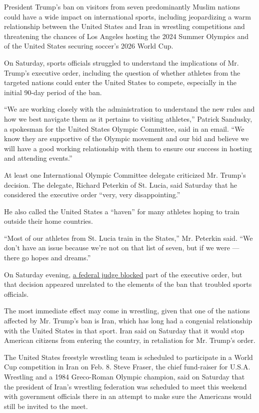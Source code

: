 President Trump's ban on visitors from seven predominantly Muslim
nations could have a wide impact on international sports, including
jeopardizing a warm relationship between the United States and Iran in
wrestling competitions and threatening the chances of Los Angeles
hosting the 2024 Summer Olympics and of the United States securing
soccer's 2026 World Cup.

On Saturday, sports officials struggled to understand the implications
of Mr. Trump's executive order, including the question of whether
athletes from the targeted nations could enter the United States to
compete, especially in the initial 90-day period of the ban.

``We are working closely with the administration to understand the new
rules and how we best navigate them as it pertains to visiting
athletes,'' Patrick Sandusky, a spokesman for the United States Olympic
Committee, said in an email. ``We know they are supportive of the
Olympic movement and our bid and believe we will have a good working
relationship with them to ensure our success in hosting and attending
events.''

At least one International Olympic Committee delegate criticized Mr.
Trump's decision. The delegate, Richard Peterkin of St. Lucia, said
Saturday that he considered the executive order ``very, very
disappointing.''

He also called the United States a ``haven'' for many athletes hoping to
train outside their home countries.

``Most of our athletes from St. Lucia train in the States,'' Mr.
Peterkin said. ``We don't have an issue because we're not on that list
of seven, but if we were --- there go hopes and dreams.''

On Saturday evening,
\href{https://www.nytimes3xbfgragh.onion/2017/01/28/us/refugees-detained-at-us-airports-prompting-legal-challenges-to-trumps-immigration-order.html}{a
federal judge blocked} part of the executive order, but that decision
appeared unrelated to the elements of the ban that troubled sports
officials.

The most immediate effect may come in wrestling, given that one of the
nations affected by Mr. Trump's ban is Iran, which has long had a
congenial relationship with the United States in that sport. Iran said
on Saturday that it would stop American citizens from entering the
country, in retaliation for Mr. Trump's order.

The United States freestyle wrestling team is scheduled to participate
in a World Cup competition in Iran on Feb. 8. Steve Fraser, the chief
fund-raiser for U.S.A. Wrestling and a 1984 Greco-Roman Olympic
champion, said on Saturday that the president of Iran's wrestling
federation was scheduled to meet this weekend with government officials
there in an attempt to make sure the Americans would still be invited to
the meet.

